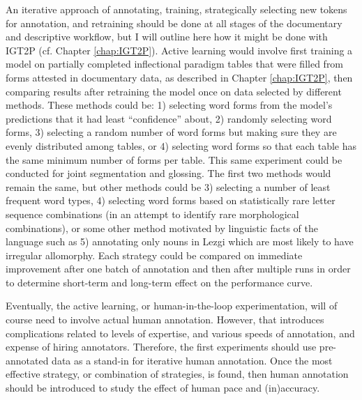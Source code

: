 An iterative approach of annotating, training, strategically selecting new tokens for annotation, and retraining should be done at all stages of the documentary and descriptive workflow, but I will outline here how it might be done with IGT2P (cf. Chapter \ref{chap:IGT2P}).
Active learning would involve first training a model on partially completed inflectional paradigm tables that were filled from forms attested in documentary data, as described in Chapter \ref{chap:IGT2P}, then comparing results after retraining the model once on data selected by different methods. These methods could be: 1) selecting word forms from the model’s predictions that it had least ``confidence'' about, 2) randomly selecting word forms, 3) selecting a random number of word forms but making sure they are evenly distributed among tables, or 4) selecting word forms so that each table has the same minimum number of forms per table. This same experiment could be conducted for joint segmentation and glossing. The first two methods would remain the same, but other methods could be 3) selecting a number of least frequent word types, 4) selecting word forms based on statistically rare letter sequence combinations (in an attempt to identify rare morphological combinations), or some other method motivated by linguistic facts of the language such as 5) annotating only nouns in Lezgi which are most likely to have irregular allomorphy. Each strategy could be compared on immediate improvement after one batch of annotation and then after multiple runs in order to determine short-term and long-term effect on the performance curve. 


Eventually, the active learning, or human-in-the-loop experimentation, will of course need to involve actual human annotation. However, that introduces complications related to levels of expertise, and various speeds of annotation, and expense of hiring annotators. Therefore, the first experiments should use pre-annotated data as a stand-in for iterative human annotation. Once the most effective strategy, or combination of strategies, is found, then human annotation should be introduced to study the effect of human pace and (in)accuracy. 

